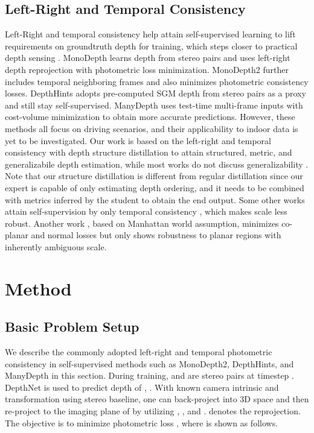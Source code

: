 \documentclass[10pt,twocolumn,letterpaper]{article}
\begin{document}
\subsection{Left-Right and Temporal Consistency}
\label{sec:self-supervised}
Left-Right and temporal consistency help attain self-supervised learning to lift requirements on groundtruth depth for training, which steps closer to practical depth sensing \cite{klingner2020self, guizilini20203d, kumar2020unrectdepthnet, Kumar_2021_WACV, poggi2020uncertainty}. MonoDepth \cite{godard2017unsupervised} learns depth from stereo pairs and uses left-right depth reprojection with photometric loss minimization. MonoDepth2 \cite{Godard_2019_ICCV} further includes temporal neighboring frames and also minimizes photometric consistency losses. DepthHints \cite{watson2019self} adopts pre-computed SGM \cite{hirschmuller2006stereo, hirschmuller2007stereo} depth from stereo pairs as a proxy and still stay self-supervised. ManyDepth \cite{watson2021temporal} uses test-time multi-frame inputs with cost-volume minimization to obtain more accurate predictions. However, these methods all focus on driving scenarios, and their applicability to indoor data is yet to be investigated. Our work is based on the left-right and temporal consistency with depth structure distillation to attain structured, metric, and generalizabile depth estimation, while most works do not discuss generalizability \cite{yang2020d3vo, gu2021dro, gordon2019depth, Godard_2019_ICCV,watson2021temporal}. Note that our structure distillation is different from regular distillation \cite{hinton2015distilling,zagoruyko2016paying, romero2014fitnets} since our expert is capable of only estimating depth ordering, and it needs to be combined with metrics inferred by the student to obtain the end output.
Some other works attain self-supervision by only temporal consistency \cite{bian2021unsupervised,  ji2021monoindoor}, which makes scale less robust. Another work \cite{li2021structdepth}, based on Manhattan world assumption, minimizes co-planar and normal losses but only shows robustness to planar regions with inherently ambiguous scale. 

\section{Method}
\label{sec:method}
\subsection{Basic Problem Setup}
\label{sec:setup}
We describe the commonly adopted left-right and temporal photometric consistency in self-supervised methods such as MonoDepth2, DepthHints, and ManyDepth in this section.
During training,  and  are stereo pairs at timestep . DepthNet  is used to predict depth of , . With known camera intrinsic  and transformation  using stereo baseline, one can back-project  into 3D space and then re-project to the imaging plane of  by utilizing , , and .  denotes the reprojection. The objective is to minimize photometric loss , where  is shown as follows.
\end{document}
